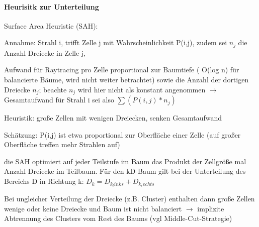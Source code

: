\documentclass[landscape]{article}
\begin{document}
\begin{multicols}{3}
  \paragraph*{Heurisitk zur Unterteilung}
  \begin{itemize*}
    \item Surface Area Heuristic (SAH):
          \begin{itemize*}
            \item Annahme: Strahl i, trifft Zelle j mit Wahrscheinlichkeit P(i,j), zudem sei $n_j$ die Anzahl Dreiecke in Zelle j,
            \item Aufwand für Raytracing pro Zelle proportional zur Baumtiefe ( O(log n) für balancierte Bäume, wird nicht weiter betrachtet) sowie die Anzahl der dortigen Dreiecke $n_j$; beachte $n_j$ wird hier nicht als konstant angenommen $\rightarrow$ Gesamtaufwand für Strahl i sei also $\sum(P(i,j)*n_j)$
          \end{itemize*}
    \item Heuristik: große Zellen mit wenigen Dreiecken, senken Gesamtaufwand
          \begin{itemize*}
            \item Schätzung: P(i,j) ist etwa proportional zur Oberfläche einer Zelle (auf großer Oberfläche treffen mehr Strahlen auf)
            \item die SAH optimiert auf jeder Teilstufe im Baum das Produkt der Zellgröße mal Anzahl Dreiecke im Teilbaum. Für den kD-Baum gilt bei der Unterteilung des Bereichs D in Richtung k: $D_k = D_{k_links} + D_{k_rechts}$
          \end{itemize*}
    \item Bei ungleicher Verteilung der Dreiecke (z.B. Cluster) enthalten dann große Zellen wenige oder keine Dreiecke und Baum ist nicht balanciert $\rightarrow$ implizite Abtrennung des Clusters vom Rest des Baums (vgl Middle-Cut-Strategie)
  \end{itemize*}
  

\end{multicols}
\end{document}
